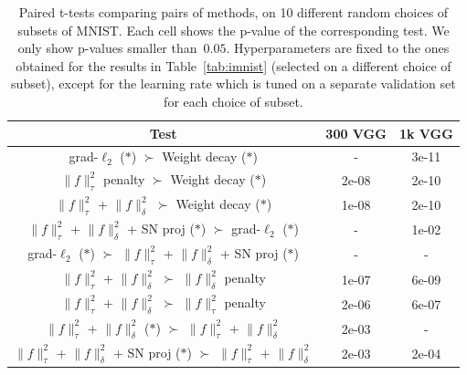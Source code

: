 \begin{table}
\caption{Paired t-tests comparing pairs of methods,
on 10 different random choices of subsets of MNIST.
Each cell shows the p-value of the corresponding test.
We only show p-values smaller than~$0.05$.
Hyperparameters are fixed to the ones obtained for the results in Table~\ref{tab:imnist}
(selected on a different choice of subset), except for the learning rate which is tuned on
a separate validation set for each choice of subset.
}
\centering
\vspace{0.2cm}
\label{tab:imnist_ttests}
\begin{tabular}{ | c | c | c |  }
\hline
Test & 300 VGG & 1k VGG \\ \hline
\hline
grad-$\ell_2$ ($\ast$) $\succ$ Weight decay ($\ast$) & - & 3e-11\\ \hline
$\|f\|_\tau^2$ penalty $\succ$ Weight decay ($\ast$) & 2e-08 & 2e-10\\ \hline
$\|f\|_{\tau}^2$ + $\|f\|^2_\delta$ $\succ$ Weight decay ($\ast$) & 1e-08 & 2e-10\\ \hline
$\|f\|_{\tau}^2$ + $\|f\|^2_\delta$ + SN proj ($\ast$) $\succ$ grad-$\ell_2$ ($\ast$) & - & 1e-02\\ \hline
grad-$\ell_2$ ($\ast$) $\succ$ $\|f\|_{\tau}^2$ + $\|f\|^2_\delta$ + SN proj ($\ast$) & - & -\\ \hline
$\|f\|_{\tau}^2$ + $\|f\|^2_\delta$ $\succ$ $\|f\|_\delta^2$ penalty & 1e-07 & 6e-09\\ \hline
$\|f\|_{\tau}^2$ + $\|f\|^2_\delta$ $\succ$ $\|f\|_\tau^2$ penalty & 2e-06 & 6e-07\\ \hline
$\|f\|_{\tau}^2$ + $\|f\|^2_\delta$ ($\ast$) $\succ$ $\|f\|_{\tau}^2$ + $\|f\|^2_\delta$ & 2e-03 & -\\ \hline
$\|f\|_{\tau}^2$ + $\|f\|^2_\delta$ + SN proj ($\ast$) $\succ$ $\|f\|_{\tau}^2$ + $\|f\|^2_\delta$ & 2e-03 & 2e-04\\ \hline
\end{tabular}
\end{table}


